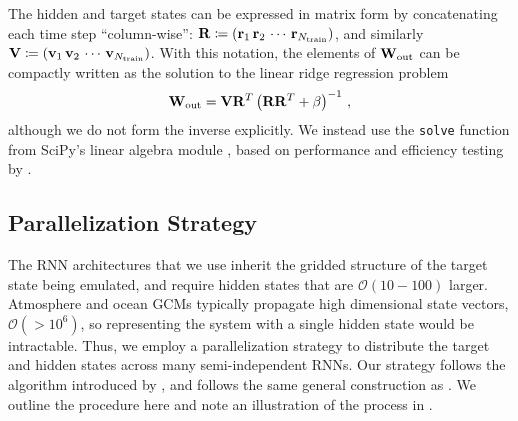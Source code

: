 The hidden and target states can be expressed in matrix form by concatenating
each time step ``column-wise'':
$\mathbf{R} \coloneqq (\mathbf{r}_1 \, \mathbf{r}_2 \, \cdots \, \mathbf{r}_{N_\text{train}})$,
and similarly
$\mathbf{V} \coloneqq (\mathbf{v}_1 \, \mathbf{v}_2 \, \cdots \, \mathbf{v}_{N_\text{train}})$.
With this notation, the elements of $\mathbf{W}_\text{out}$ can be compactly written as the
solution to the linear ridge regression problem
\begin{equation}
    \mathbf{W}_\text{out} = \mathbf{V} \mathbf{R}^T \left(\mathbf{R}\mathbf{R}^T + \beta\right)^{-1} \, ,
    \label{eq:ridge_regression}
\end{equation}
although we do not form the inverse explicitly.
We instead use the \texttt{solve} function from SciPy's linear algebra module
\citep{scipy_2020}, based on performance and efficiency testing by
\citet{platt_systematic_2022}. 


\subsection{Parallelization Strategy}
\label{subsec:parallelization}

The RNN architectures that we use inherit the gridded structure of the target
state being emulated, and require hidden states that are
$\mathcal{O}(10-100)$ larger.
Atmosphere and ocean GCMs typically propagate high dimensional state vectors,
$\mathcal{O}(>10^6)$,
so representing the system with a single hidden state would be intractable.
Thus, we employ a parallelization strategy to distribute the target and hidden
states across many semi-independent RNNs.
Our strategy follows the algorithm introduced by \citet{pathak_model-free_2018},
and follows the same general construction as \citet{arcomano_machine_2020}.
We outline the procedure here and note an illustration of the process in
.

